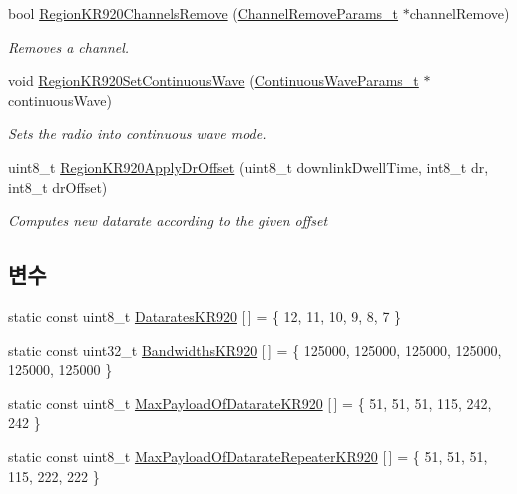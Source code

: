 \begin{DoxyCompactItemize}
bool \mbox{\hyperlink{group___r_e_g_i_o_n_k_r920_gaada1222081dd856fe052d63f94bb78dd}{Region\+K\+R920\+Channels\+Remove}} (\mbox{\hyperlink{group___r_e_g_i_o_n_gaa37468560d2fc81a977b57a48e5d72c0}{Channel\+Remove\+Params\+\_\+t}} $\ast$channel\+Remove)
\begin{DoxyCompactList}\small\item\em Removes a channel. \end{DoxyCompactList}\item 
void \mbox{\hyperlink{group___r_e_g_i_o_n_k_r920_gaaa9c13bab01bbfc0445b49587c59b8e7}{Region\+K\+R920\+Set\+Continuous\+Wave}} (\mbox{\hyperlink{group___r_e_g_i_o_n_gaf39bb5ba06921139c6d17f88a8d518cd}{Continuous\+Wave\+Params\+\_\+t}} $\ast$continuous\+Wave)
\begin{DoxyCompactList}\small\item\em Sets the radio into continuous wave mode. \end{DoxyCompactList}\item 
uint8\+\_\+t \mbox{\hyperlink{group___r_e_g_i_o_n_k_r920_ga7a581cc43a0d722cc553966d021df020}{Region\+K\+R920\+Apply\+Dr\+Offset}} (uint8\+\_\+t downlink\+Dwell\+Time, int8\+\_\+t dr, int8\+\_\+t dr\+Offset)
\begin{DoxyCompactList}\small\item\em Computes new datarate according to the given offset \end{DoxyCompactList}\end{DoxyCompactItemize}
\subsection*{변수}
\begin{DoxyCompactItemize}
\item 
static const uint8\+\_\+t \mbox{\hyperlink{group___r_e_g_i_o_n_k_r920_gad80bddd73920e3855ac0568c7e3fdbff}{Datarates\+K\+R920}} \mbox{[}$\,$\mbox{]} = \{ 12, 11, 10, 9, 8, 7 \}
\item 
static const uint32\+\_\+t \mbox{\hyperlink{group___r_e_g_i_o_n_k_r920_ga8f1abef3b467ea68edb452c7adcc8e08}{Bandwidths\+K\+R920}} \mbox{[}$\,$\mbox{]} = \{ 125000, 125000, 125000, 125000, 125000, 125000 \}
\item 
static const uint8\+\_\+t \mbox{\hyperlink{group___r_e_g_i_o_n_k_r920_ga440b303161bd0b85c9c31af0a28904ed}{Max\+Payload\+Of\+Datarate\+K\+R920}} \mbox{[}$\,$\mbox{]} = \{ 51, 51, 51, 115, 242, 242 \}
\item 
static const uint8\+\_\+t \mbox{\hyperlink{group___r_e_g_i_o_n_k_r920_ga57cb41db0862ca11e76201e87843f2e0}{Max\+Payload\+Of\+Datarate\+Repeater\+K\+R920}} \mbox{[}$\,$\mbox{]} = \{ 51, 51, 51, 115, 222, 222 \}
\end{DoxyCompactItemize}


